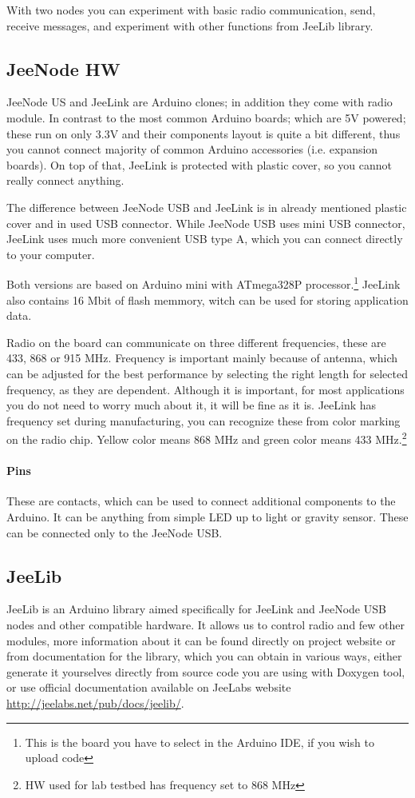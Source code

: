 \documentclass[12pt,titlepage]{article}
\begin{document}
With two nodes you can experiment with basic radio communication, send, receive messages, and experiment with other functions from JeeLib library.

     \subsection{JeeNode HW }
JeeNode US and JeeLink are Arduino clones; in addition they come with radio module. In contrast to the most common Arduino boards; which are 5V powered; these run on only 3.3V and their components layout is quite a bit different, thus you cannot connect majority of common Arduino accessories (i.e. expansion boards). On top of that, JeeLink is protected with plastic cover, so you cannot really connect anything.

The difference between JeeNode USB and JeeLink is in already mentioned plastic cover and in used USB connector. While JeeNode USB uses mini USB connector, JeeLink uses much more convenient USB type A, which you can connect directly to your computer.

Both versions are based on Arduino mini with ATmega328P processor.\footnote{This is the board you have to select in the Arduino IDE, if you wish to upload code}
JeeLink also contains 16 Mbit of flash memmory, witch can be used for storing application data.

Radio on the board can communicate on three different frequencies, these are 433, 868 or 915 MHz. Frequency is important mainly because of antenna, which can be adjusted for the best performance by selecting the right length for selected frequency, as they are dependent. Although it is important, for most applications you do not need to worry much about it, it will be fine as it is.  JeeLink has frequency set during manufacturing, you can recognize these from color marking on the radio chip. Yellow color means 868 MHz and green color means 433 MHz.\footnote{HW used for lab testbed has frequency set to 868 MHz}
\paragraph{Pins}
  These are contacts, which can be used to connect additional components to the Arduino. It can be anything from simple LED up to light or gravity sensor. These can be connected only to the JeeNode USB.

  \subsection{JeeLib}
    JeeLib is an Arduino library aimed specifically for JeeLink and JeeNode USB nodes and other compatible hardware. It allows us to control radio and few other modules, more information about it can be found directly on project website  or from documentation for the library, which you can obtain in various ways, either generate it yourselves directly from source code you are using with Doxygen tool, or use official documentation available on JeeLabs website \url{http://jeelabs.net/pub/docs/jeelib/}.
\end{document}
